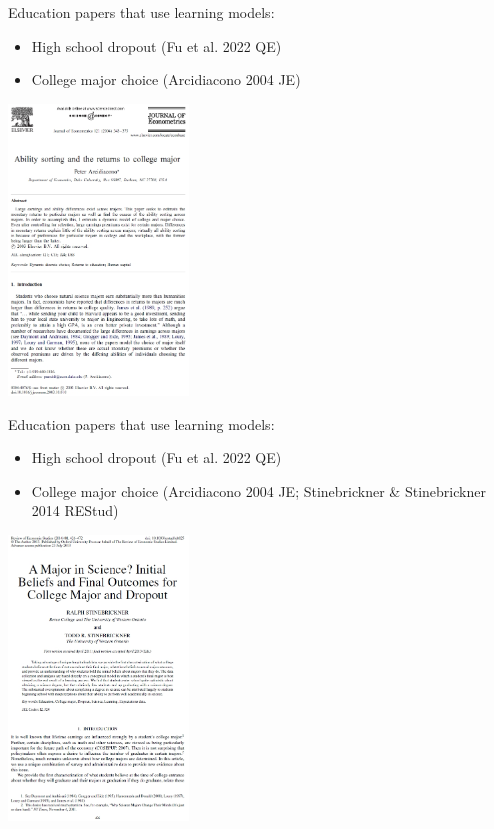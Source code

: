 \documentclass[aspectratio=169]{beamer}
\begin{document}
\begin{frame}
Education papers that use learning models:
\bigskip\par
\begin{itemize}
\itemsep1.5em
\item High school dropout (Fu et al. 2022 QE)
\item College major choice (Arcidiacono 2004 JE)
\end{itemize}
\end{frame}

\begin{frame}
\centering
\includegraphics[width=0.36\textwidth]{Arcidiacono_2004_JE_cover.jpg}
\end{frame}


\begin{frame}
Education papers that use learning models:
\bigskip\par
\begin{itemize}
\itemsep1.5em
\item High school dropout (Fu et al. 2022 QE)
\item College major choice (Arcidiacono 2004 JE; Stinebrickner \& Stinebrickner 2014 REStud)
\end{itemize}
\end{frame}

\begin{frame}
\centering
\includegraphics[width=0.36\textwidth]{Stinebrickner2_2014_REStud_cover.jpg}
\end{frame}
\end{document}
